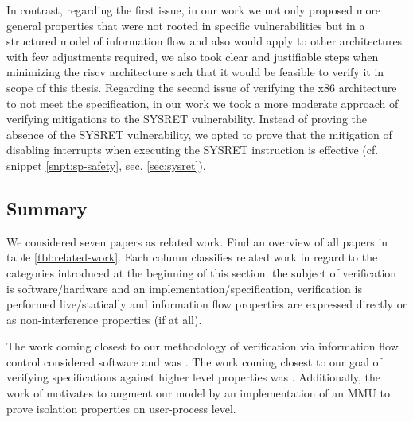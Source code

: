 In contrast, regarding the first issue, in our work we not only proposed more general properties that were not rooted in specific vulnerabilities but in a structured model of information flow and also would apply to other architectures with few adjustments required, we also took clear and justifiable steps when minimizing the \gls{riscv} architecture such that it would be feasible to verify it in scope of this thesis.
Regarding the second issue of verifying the x86 architecture to not meet the specification, in our work we took a more moderate approach of verifying mitigations to the SYSRET vulnerability.
Instead of proving the absence of the SYSRET vulnerability, we opted to prove that the mitigation of disabling interrupts when executing the SYSRET instruction is effective (cf. snippet \ref{snpt:sp-safety}, sec. \ref{sec:sysret}).

\subsection{Summary}

We considered seven papers as related work.
Find an overview of all papers in table \ref{tbl:related-work}.
Each column classifies related work in regard to the categories introduced at the beginning of this section: the subject of verification is software/hardware and an implementation/specification, verification is performed live/statically and information flow properties are expressed directly or as non-interference properties (if at all).

The work coming closest to our methodology of verification via information flow control considered software and was \cite{GordonKPGNR15,SuhLZD04}.
The work coming closest to our goal of verifying specifications against higher level properties was \cite{Fox02,KhakpourSD13,BradfieldS16}.
Additionally, the work of \cite{SuhLZD04,KhakpourSD13} motivates to augment our model by an implementation of an MMU to prove isolation properties on user-process level.

